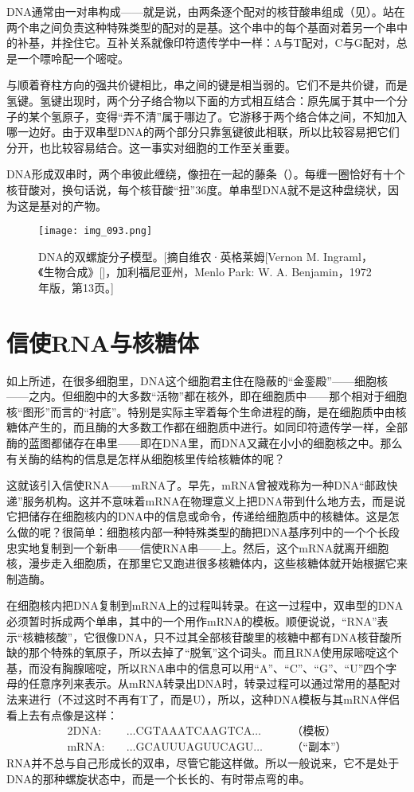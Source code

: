 DNA通常由一对串构成——就是说，由两条逐个配对的核苷酸串组成（见）。站在两个串之间负责这种特殊类型的配对的是基。这个串中的每个基面对着另一个串中的补基，并拴住它。互补关系就像印符遗传学中一样：A与T配对，C与G配对，总是一个嘌呤配一个嘧啶。

与顺着脊柱方向的强共价键相比，串之间的键是相当弱的。它们不是共价键，而是氢键。氢键出现时，两个分子络合物以下面的方式相互结合：原先属于其中一个分子的某个氢原子，变得“弄不清”属于哪边了。它游移于两个络合体之间，不知加入哪一边好。由于双串型DNA的两个部分只靠氢键彼此相联，所以比较容易把它们分开，也比较容易结合。这一事实对细胞的工作至关重要。

DNA形成双串时，两个串彼此缠绕，像扭在一起的藤条（）。每缠一圈恰好有十个核苷酸对，换句话说，每个核苷酸“扭”$36$度。单串型DNA就不是这种盘绕状，因为这是基对的产物。

\begin{figure}
\texttt{[image: img\_093.png]}
\caption[DNA的双螺旋分子模型。]
  {DNA的双螺旋分子模型。[摘自维农·英格莱姆[Vernon M. Ingraml，《生物合成》[]，加利福尼亚州，Menlo Park: W. A. Benjamin，1972年版，第13页。]}
\end{figure}

\section{信使RNA与核糖体}

如上所述，在很多细胞里，DNA这个细胞君主住在隐蔽的“金銮殿”——细胞核——之内。但细胞中的大多数“活物”都在核外，即在细胞质中——那个相对于细胞核“图形”而言的“衬底”。特别是实际主宰着每个生命进程的酶，是在细胞质中由核糖体产生的，而且酶的大多数工作都在细胞质中进行。如同印符遗传学一样，全部酶的蓝图都储存在串里——即在DNA里，而DNA又藏在小小的细胞核之中。那么有关酶的结构的信息是怎样从细胞核里传给核糖体的呢？

这就该引入信使RNA——mRNA了。早先，mRNA曾被戏称为一种DNA“邮政快递”服务机构。这并不意味着mRNA在物理意义上把DNA带到什么地方去，而是说它把储存在细胞核内的DNA中的信息或命令，传递给细胞质中的核糖体。这是怎么做的呢？很简单：细胞核内部一种特殊类型的酶把DNA基序列中的一个个长段忠实地复制到一个新串——信使RNA串——上。然后，这个mRNA就离开细胞核，漫步走入细胞质，在那里它又跑进很多核糖体内，这些核糖体就开始根据它来制造酶。

在细胞核内把DNA复制到mRNA上的过程叫转录。在这一过程中，双串型的DNA必须暂时拆成两个单串，其中的一个用作mRNA的模板。顺便说说，“RNA”表示“核糖核酸”，它很像DNA，只不过其全部核苷酸里的核糖中都有DNA核苷酸所缺的那个特殊的氧原子，所以去掉了“脱氧”这个词头。而且RNA使用尿嘧啶这个基，而没有胸腺嘧啶，所以RNA串中的信息可以用“A”、“C”、“G”、“U”四个字母的任意序列来表示。从mRNA转录出DNA时，转录过程可以通过常用的基配对法来进行（不过这时不再有T了，而是U），所以，这种DNA模板与其mRNA伴侣看上去有点像是这样：
\begin{alignat*}{2}
\mathrm{DNA}:&\quad\dotsc\mathrm{CGTAAATCAAGTCA}\dotsc  &\quad&\text{（模板）}\\
\mathrm{mRNA}:&\quad\dotsc\mathrm{GCAUUUAGUUCAGU}\dotsc &     &\text{（“副本”）}
\end{alignat*}
RNA并不总与自己形成长的双串，尽管它能这样做。所以一般说来，它不是处于DNA的那种螺旋状态中，而是一个长长的、有时带点弯的串。

